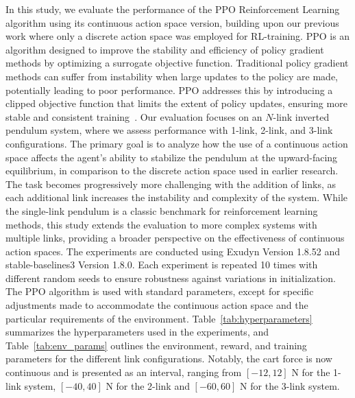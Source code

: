 In this study, we evaluate the performance of the PPO Reinforcement Learning algorithm using its continuous action space version, building upon our previous work where only a discrete action space was employed for RL-training. PPO is an algorithm designed to improve the stability and efficiency of policy gradient methods by optimizing a surrogate objective function.
Traditional policy gradient methods can suffer from instability when large updates to the policy are made, potentially leading to poor performance. PPO addresses this by introducing a clipped objective function that limits the extent of policy updates, ensuring more stable and consistent training~\cite{schulman2017ppo}.
Our evaluation focuses on an $N$-link inverted pendulum system, where we assess performance with 1-link, 2-link, and 3-link configurations. The primary goal is to analyze how the use of a continuous action space affects the agent's ability to stabilize the pendulum at the upward-facing equilibrium, in comparison to the discrete action space used in earlier research. The task becomes progressively more challenging with the addition of links, as each additional link increases the instability and complexity of the system. While the single-link pendulum is a classic benchmark for reinforcement learning methods, this study extends the evaluation to more complex systems with multiple links, providing a broader perspective on the effectiveness of continuous action spaces.
The experiments are conducted using Exudyn Version 1.8.52 and stable-baselines3 Version 1.8.0. Each experiment is repeated 10 times with different random seeds to ensure robustness against variations in initialization. The PPO algorithm is used with standard parameters, except for specific adjustments made to accommodate the continuous action space and the particular requirements of the environment.
Table~\ref{tab:hyperparameters} summarizes the hyperparameters used in the experiments, and Table~\ref{tab:env_params} outlines the environment, reward, and training parameters for the different link configurations. Notably, the cart force is now continuous and is presented as an interval, ranging from \([-12, 12]\) N for the 1-link system, \([-40, 40]\) N for the 2-link and \([-60, 60]\) N for the 3-link system.

